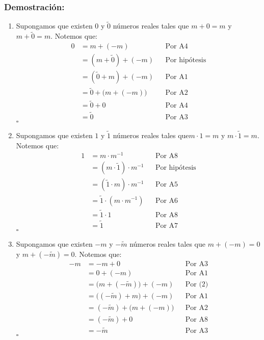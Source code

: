 \documentclass[11pt]{article}
\begin{document}
\subsubsection*{Demostración:}
\begin{enumerate}[label=\alph*), font=\bfseries]
    \item Supongamos que existen 0 y $\tilde{0}$ números reales tales que $m+0 = m$ y $m+\tilde{0} = m$. Notemos que: \begin{align*}
        0 &=m+(-m) && \text{Por A4}\\
        &=\left( m+\tilde{0} \right)+\left(-m\right) && \text{Por hipótesis}\\
        &=\left( \tilde{0}+m \right)+\left(-m\right) && \text{Por A1}\\
        &=\tilde{0} + \bigl( m + \left(-m \right)\bigr) && \text{Por A2}\\
        &=\tilde{0} + 0 && \text{Por A4}\\
        &=\tilde{0} && \text{Por A3}
        \end{align*} \mbox{}\hfill $\square$

    \item Supongamos que existen $1$ y $\tilde{1}$ números reales tales que$m\cdot 1=m$ y $m\cdot\tilde{1}=m$. Notemos que:
        \begin{align*}
        1 &= m \cdot m^{-1} && \text{Por A8}\\
        &= \left( m \cdot \tilde{1} \right) \cdot m^{-1} && \text{Por hipótesis}\\
        &= \left( \tilde{1} \cdot m \right) \cdot m^{-1} && \text{Por A5}\\
        &= \tilde{1} \cdot \left( m \cdot m^{-1} \right) && \text{Por A6}\\
        &= \tilde{1} \cdot 1 && \text{Por A8}\\
        &= \tilde{1} && \text{Por A7}
        \end{align*} \mbox{}\hfill $\square$

    \item Supongamos que existen $-m$ y $-\tilde{m}$ números reales tales que $m + \left(-m\right) = 0$ y $m + \left(- \tilde{m}\right) = 0$. Notemos que:
        \begin{align*}
        -m &= -m+0 && \text{Por A3}\\
        &= 0+\left(-m\right) && \text{Por A1}\\
        &= \bigl(m+\left(-\tilde{m} \right)\bigr)+\left(-m\right) && \text{Por (2)}\\
        &= \bigl(\left(-\tilde{m} \right)+m\bigr)+\left(-m\right) && \text{Por A1}\\
        &= \left(-\tilde{m} \right)+\bigl(m+\left(-m\right)\bigr) && \text{Por A2}\\
        &= \left(-\tilde{m} \right)+0 && \text{Por A8}\\
        &= -\tilde{m} && \text{Por A3}
        \end{align*} \mbox{}\hfill $\square$


\end{enumerate}
\end{document}

